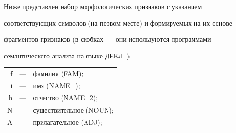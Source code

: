     Ниже представлен набор морфологических признаков с указанием

соответствующих символов (на первом месте) и формируемых на их основе

фраг\-мен\-тов-при\-зна\-ков (в скобках~--- они используются программами

семантического анализа на языке ДЕКЛ~\cite{8-som}):



\begin{tabular}{rcl}

    f &---& фамилия (FAM);\\

    i&---& имя (NAME\_);\\

    h&---& отчество (NAME\_2);\\

    N&---& существительное (NOUN);\\

    A&---& прилагательное (ADJ);

    \end{tabular}



\noindent

